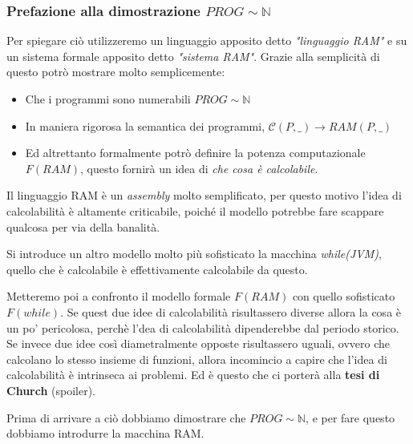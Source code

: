 \documentclass{article}
\begin{document}
\subsubsection{Prefazione alla dimostrazione $PROG\sim\mathbb{N}$}
Per spiegare ciò utilizzeremo un linguaggio apposito detto
\textit{"linguaggio RAM"} e su un sistema formale apposito detto \textit{"sistema RAM"}.
Grazie alla semplicità di questo potrò mostrare molto semplicemente:
\begin{itemize}
    \item Che i programmi sono numerabili $PROG\sim\mathbb{N}$
    \item In maniera rigorosa la semantica dei programmi, $\mathcal{C}(P,\_)\rightarrow RAM(P,\_)$
    \item Ed altrettanto formalmente potrò definire la potenza computazionale $F(RAM)$, questo fornirà
          un idea di \textit{che cosa è calcolabile}.
\end{itemize}
Il linguaggio RAM è un \textit{assembly} molto semplificato, per questo motivo l'idea di
calcolabilità è altamente criticabile, poiché il modello potrebbe fare scappare qualcosa
per via della banalità.

Si introduce un altro modello molto più sofisticato la macchina \textit{while(JVM)}, quello
che è calcolabile è effettivamente calcolabile da questo.

Metteremo poi a confronto il modello formale $F(RAM)$ con quello sofisticato $F(while)$. Se
quest due idee di calcolabilità risultassero diverse allora la cosa è un po'
pericolosa, perchè l'dea di calcolabilità dipenderebbe dal periodo storico.
Se invece due idee così diametralmente opposte risultassero uguali, ovvero che calcolano
lo stesso insieme di funzioni, allora incomincio a capire che l'idea di calcolabilità è intrinseca
ai problemi. Ed è questo che ci porterà alla \textbf{tesi di Church} (spoiler).

Prima di arrivare a ciò dobbiamo dimostrare che $PROG\sim\mathbb{N}$, e per fare questo dobbiamo
introdurre la macchina RAM.
\end{document}
